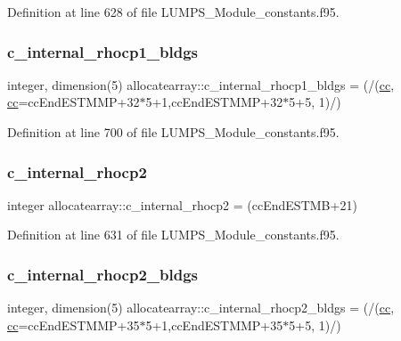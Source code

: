 Definition at line 628 of file L\+U\+M\+P\+S\+\_\+\+Module\+\_\+constants.\+f95.

\mbox{\label{namespaceallocatearray_a1592e6ac2bce2d65c9e0ebe0e5c97122}} 
\subsubsection{\texorpdfstring{c\+\_\+internal\+\_\+rhocp1\+\_\+bldgs}{c\_internal\_rhocp1\_bldgs}}
{\footnotesize\ttfamily integer, dimension(5) allocatearray\+::c\+\_\+internal\+\_\+rhocp1\+\_\+bldgs = (/(\hyperlink{namespaceallocatearray_ac863c81704eb507dee10f5e10741e10c}{cc}, \hyperlink{namespaceallocatearray_ac863c81704eb507dee10f5e10741e10c}{cc}=cc\+End\+E\+S\+T\+M\+MP+32$\ast$5+1,cc\+End\+E\+S\+T\+M\+MP+32$\ast$5+5, 1)/)}



Definition at line 700 of file L\+U\+M\+P\+S\+\_\+\+Module\+\_\+constants.\+f95.

\mbox{\label{namespaceallocatearray_a1f3c275526104fca707a950b63b52287}} 
\subsubsection{\texorpdfstring{c\+\_\+internal\+\_\+rhocp2}{c\_internal\_rhocp2}}
{\footnotesize\ttfamily integer allocatearray\+::c\+\_\+internal\+\_\+rhocp2 = (cc\+End\+E\+S\+T\+MB+21)}



Definition at line 631 of file L\+U\+M\+P\+S\+\_\+\+Module\+\_\+constants.\+f95.

\mbox{\label{namespaceallocatearray_a4ec1b8fb02c4b559c4fb8d8b82b800fb}} 
\subsubsection{\texorpdfstring{c\+\_\+internal\+\_\+rhocp2\+\_\+bldgs}{c\_internal\_rhocp2\_bldgs}}
{\footnotesize\ttfamily integer, dimension(5) allocatearray\+::c\+\_\+internal\+\_\+rhocp2\+\_\+bldgs = (/(\hyperlink{namespaceallocatearray_ac863c81704eb507dee10f5e10741e10c}{cc}, \hyperlink{namespaceallocatearray_ac863c81704eb507dee10f5e10741e10c}{cc}=cc\+End\+E\+S\+T\+M\+MP+35$\ast$5+1,cc\+End\+E\+S\+T\+M\+MP+35$\ast$5+5, 1)/)}



